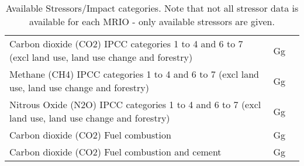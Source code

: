 \begin{table}
\begin{tabular}{ l l l }
Carbon dioxide (CO2) IPCC categories 1 to 4 and 6 to 7 (excl land use, land use change and forestry) & Gg             &                                                  \\
Methane (CH4) IPCC categories 1 to 4 and 6 to 7 (excl land use, land use change and forestry)        & Gg             &                                                  \\
Nitrous Oxide (N2O) IPCC categories 1 to 4 and 6 to 7 (excl land use, land use change and forestry)  & Gg             &                                                  \\
Carbon dioxide (CO2) Fuel combustion                                                                 & Gg             &                                                  \\
Carbon dioxide (CO2) Fuel combustion and cement                                                      & Gg             &                                                  \\
\end{tabular}

\caption{Available Stressors/Impact categories. Note that not all stressor data is available for each MRIO - only available stressors are given.}
\end{table}